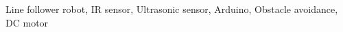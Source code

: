 \begin{IEEEkeywords}
    Line follower robot, IR sensor, Ultrasonic sensor, Arduino, Obstacle avoidance, DC motor
\end{IEEEkeywords}
